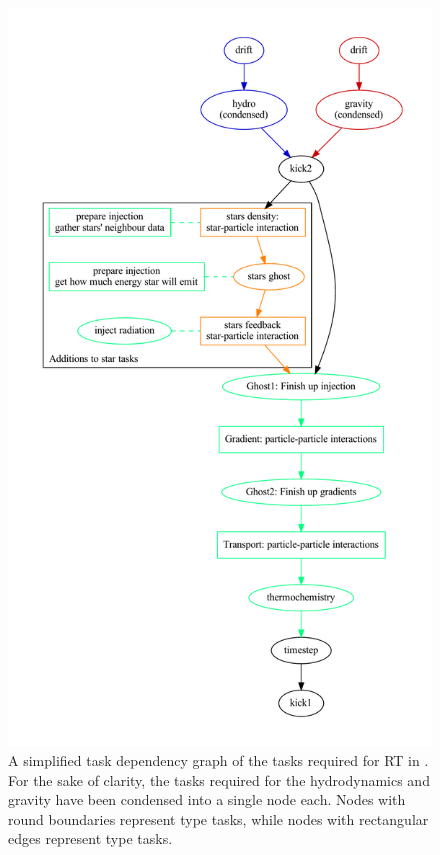 \begin{figure}
 \centering
 \includegraphics[width=.8\textwidth]{figures/RHD/RTTaskDependencies-simplified.pdf}%
 \caption{
A simplified task dependency graph of the tasks required for RT in \swift. For the sake of clarity,
the tasks required for the hydrodynamics and gravity have been condensed into a single node each.
Nodes with round boundaries represent  type tasks, while nodes with rectangular
edges represent  type tasks.
 }
 \label{fig:RTtaskplot-simplified}
\end{figure}



